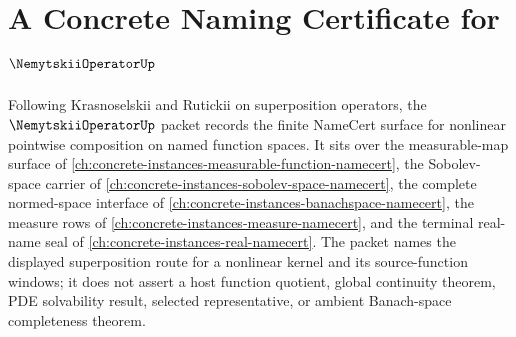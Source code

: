 \chapter{A Concrete Naming Certificate for $\NemytskiiOperatorUp$}
\label{ch:concrete-instances-nemytskii-operator-namecert}

Following Krasnoselskii and Rutickii on superposition operators, the $\NemytskiiOperatorUp$ packet records the finite NameCert surface for nonlinear pointwise composition on named function spaces. It sits over the measurable-map surface of \autoref{ch:concrete-instances-measurable-function-namecert}, the Sobolev-space carrier of \autoref{ch:concrete-instances-sobolev-space-namecert}, the complete normed-space interface of \autoref{ch:concrete-instances-banachspace-namecert}, the measure rows of \autoref{ch:concrete-instances-measure-namecert}, and the terminal real-name seal of \autoref{ch:concrete-instances-real-namecert}. The packet names the displayed superposition route for a nonlinear kernel and its source-function windows; it does not assert a host function quotient, global continuity theorem, PDE solvability result, selected representative, or ambient Banach-space completeness theorem.

